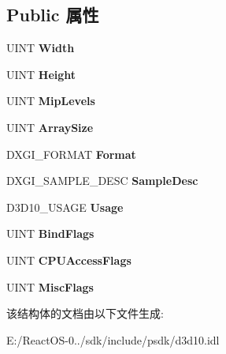 \subsection*{Public 属性}
\begin{DoxyCompactItemize}
\item 
\mbox{\label{struct_d3_d10___t_e_x_t_u_r_e2_d___d_e_s_c_a3c9b5bad628f763daa5a2c5d8f5e49d4}} 
U\+I\+NT {\bfseries Width}
\item 
\mbox{\label{struct_d3_d10___t_e_x_t_u_r_e2_d___d_e_s_c_ab50710f761f801e8025d65055e415db3}} 
U\+I\+NT {\bfseries Height}
\item 
\mbox{\label{struct_d3_d10___t_e_x_t_u_r_e2_d___d_e_s_c_a4d1c2f4d270596933f30ff1319e630b2}} 
U\+I\+NT {\bfseries Mip\+Levels}
\item 
\mbox{\label{struct_d3_d10___t_e_x_t_u_r_e2_d___d_e_s_c_a2cd2b010159bc9ca0558562837f63bc9}} 
U\+I\+NT {\bfseries Array\+Size}
\item 
\mbox{\label{struct_d3_d10___t_e_x_t_u_r_e2_d___d_e_s_c_a069d319a7cd63783843772c4276b5e3f}} 
D\+X\+G\+I\+\_\+\+F\+O\+R\+M\+AT {\bfseries Format}
\item 
\mbox{\label{struct_d3_d10___t_e_x_t_u_r_e2_d___d_e_s_c_ac52c2d28b5e02073f723a7a300f4e8a6}} 
D\+X\+G\+I\+\_\+\+S\+A\+M\+P\+L\+E\+\_\+\+D\+E\+SC {\bfseries Sample\+Desc}
\item 
\mbox{\label{struct_d3_d10___t_e_x_t_u_r_e2_d___d_e_s_c_aecafbb3d217e28ca25fe869d343c7124}} 
D3\+D10\+\_\+\+U\+S\+A\+GE {\bfseries Usage}
\item 
\mbox{\label{struct_d3_d10___t_e_x_t_u_r_e2_d___d_e_s_c_a3b697c5395c81f649ca5669b22c58301}} 
U\+I\+NT {\bfseries Bind\+Flags}
\item 
\mbox{\label{struct_d3_d10___t_e_x_t_u_r_e2_d___d_e_s_c_a1f5b7c9b0945922ae53b29495183e18f}} 
U\+I\+NT {\bfseries C\+P\+U\+Access\+Flags}
\item 
\mbox{\label{struct_d3_d10___t_e_x_t_u_r_e2_d___d_e_s_c_a89e21616f863da44703bbd578735f5b7}} 
U\+I\+NT {\bfseries Misc\+Flags}
\end{DoxyCompactItemize}


该结构体的文档由以下文件生成\+:\begin{DoxyCompactItemize}
\item 
E\+:/\+React\+O\+S-\/0../sdk/include/psdk/d3d10.\+idl\end{DoxyCompactItemize}
